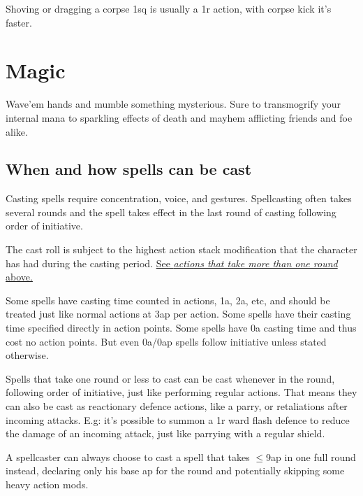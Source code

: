 Shoving or dragging a corpse 1sq is usually a 1r action, with corpse kick it's faster.













\section*{Magic}


Wave'em hands and mumble something mysterious. Sure to transmogrify your internal mana to sparkling effects of death and mayhem afflicting friends and foe alike.


\subsection*{When and how spells can be cast}
Casting spells require concentration, voice, and gestures. Spellcasting often takes several rounds and the spell takes effect in the last round of casting following order of initiative.

The cast roll is subject to the highest action stack modification that the character has had during the casting period. \hyperref[multiroundactions]{See \emph{actions that take more than one round} above.}

Some spells have casting time counted in actions, 1a, 2a, etc, and should be treated just like normal actions at 3ap per action. Some spells have their casting time specified directly in action points. Some spells have 0a casting time and thus cost no action points. But even 0a/0ap spells follow initiative unless stated otherwise.

Spells that take one round or less to cast can be cast whenever in the round, following order of initiative, just like performing regular actions. That means they can also be cast as reactionary defence actions, like a parry, or retaliations after incoming attacks.
E.g: it's possible to summon a 1r ward flash defence to reduce the damage of an incoming attack, just like parrying with a regular shield.

A spellcaster can always choose to cast a spell that takes $\le$9ap in one full round instead, declaring only his base ap for the round and potentially skipping some heavy action mods. 


